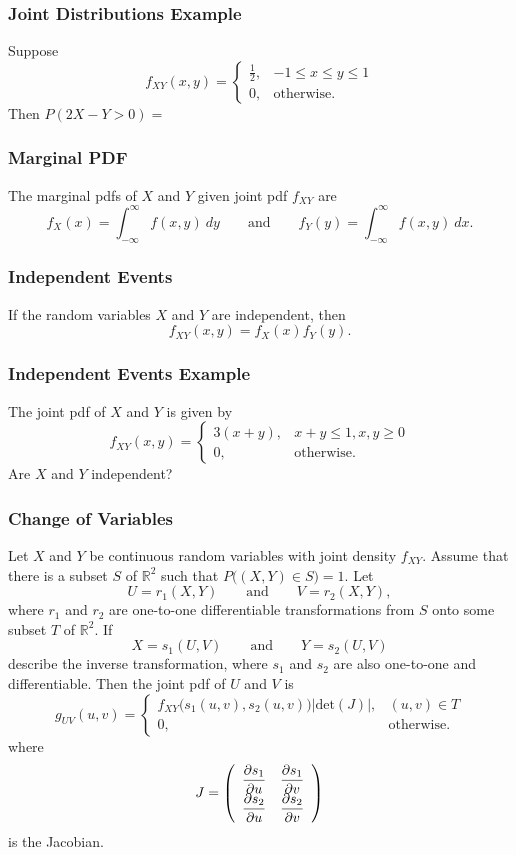 \documentclass{beamer}
\begin{document}
\begin{frame}[t]
\frametitle{Joint Distributions Example}
\begin{Example}
\small
Suppose
$$
f_{XY}(x, y) = \begin{cases} \frac{1}{2},	&	-1\leq x \leq y \leq 1\\ 0, &	\text{otherwise.}\end{cases}
$$
Then $P(2X - Y > 0) = $
\end{Example}
\end{frame}

\begin{frame}
\frametitle{Marginal PDF}
The marginal pdfs of $X$ and $Y$ given joint pdf $f_{XY}$ are
$$
f_X(x) = \int_{-\infty}^\infty f(x,y)\ dy\qquad\text{and}\qquad f_Y(y) = \int_{-\infty}^\infty f(x, y)\ dx.
$$
\end{frame}

\begin{frame}
\frametitle{Independent Events}
If the random variables $X$ and $Y$ are independent, then
$$
f_{XY}(x, y) = f_X(x) f_Y(y).
$$
\end{frame}

\begin{frame}[t]
\frametitle{Independent Events Example}
\small
\begin{Example}
The joint pdf of $X$ and $Y$ is given by
$$
f_{XY}(x, y) = \begin{cases} 3(x + y),&	x +y \leq 1, x,y \geq  0\\ 0, & \text{otherwise.}\end{cases}	
$$
Are $X$ and $Y$ independent? 
\end{Example}

\end{frame}

\begin{frame}
\frametitle{Change of Variables}
\tiny
\begin{Theorem}
Let $X$ and $Y$ be continuous random variables with joint density $f_{XY}$. Assume that there is a subset $S$ of $\mathbb{R}^2$ such that
$P\Big((X, Y)\in S\Big) = 1$. Let 
$$
U = r_1(X, Y)\qquad\text{and}\qquad V = r_2(X, Y),
$$ 
where $r_1$ and $r_2$ are one-to-one differentiable transformations from $S$ onto some subset $T$ of $\mathbb{R}^2$. If 
$$
X = s_1(U, V)\qquad\text{and}\qquad Y = s_2(U, V)
$$ 
describe the inverse transformation, where $s_1$ and $s_2$ are also one-to-one and differentiable. Then the joint pdf of $U$ and $V$ is
$$
g_{UV}(u, v) = \begin{cases} f_{XY}\Big(s_1(u, v), s_2(u, v)\Big)\left|\text{det}(J)\right|,	&	(u, v)\in T\\ 0,&	\text{otherwise.}\end{cases}
$$
where 
$$
J = \left(\begin{array}{c c} \dfrac{\partial s_1}{\partial u}	&	\dfrac{\partial s_1}{\partial v}\\ \dfrac{\partial s_2}{\partial u}	&	\dfrac{\partial s_2}{\partial v}\end{array}\right)
$$
is the Jacobian.
\end{Theorem}

\end{frame}
\end{document}
